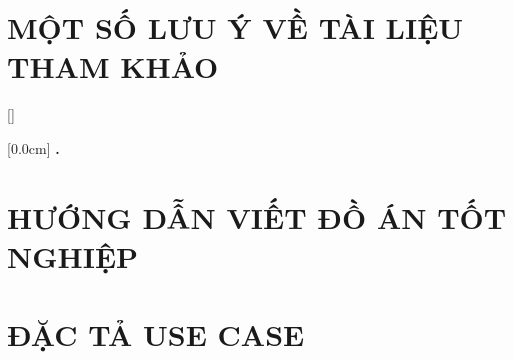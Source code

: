 \documentclass[a4paper, twoside]{report}
\theoremstyle{definition} %
\begin{document}
	\newpage
	\chapter*{MỘT SỐ LƯU Ý VỀ TÀI LIỆU THAM KHẢO} %
	\label{chapter:reference}
	
	

	
	\printbibliography[heading=bibintoc] %
	
	\appendixpage %
	\appendices %
	\addappheadtotoc %
	
	\titlespacing*{\chapter}{0pt}{-20pt}{20pt}
	
	[0.0cm]             %
	{\bfseries\vspace{0.3cm}}                  %
	{{\bfseries{\scshape} \thecontentslabel.\ }} %
	{}         %
	{\contentspage}         %
	
	
	\chapter{HƯỚNG DẪN VIẾT ĐỒ ÁN TỐT NGHIỆP}
	
	
	\newpage
	
	\chapter{ĐẶC TẢ USE CASE}
	
	
\end{document}
